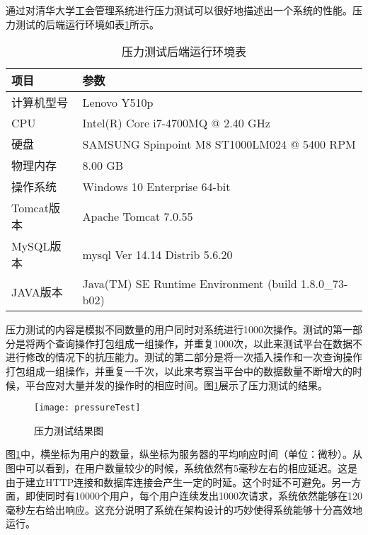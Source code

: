 通过对清华大学工会管理系统进行压力测试可以很好地描述出一个系统的性能。压力测试的后端运行环境如表\ref{table:hardware}所示。

\begin{table}
  \centering
  \caption{压力测试后端运行环境表}
  \label{table:hardware}
    \begin{tabular}{ll}
      \toprule
      项目 & 参数 \\
      \midrule %
      计算机型号 & Lenovo Y510p \\
      CPU & Intel(R) Core i7-4700MQ @ 2.40 GHz \\
      硬盘 & SAMSUNG Spinpoint M8 ST1000LM024 @ 5400 RPM \\
      物理内存 & 8.00 GB \\
      操作系统 & Windows 10 Enterprise 64-bit \\
      Tomcat版本 & Apache Tomcat 7.0.55 \\
      MySQL版本 & mysql Ver 14.14 Distrib 5.6.20\\
      JAVA版本 & Java(TM) SE Runtime Environment (build 1.8.0\_73-b02)\\
      \bottomrule
    \end{tabular}
\end{table}


压力测试的内容是模拟不同数量的用户同时对系统进行1000次操作。测试的第一部分是将两个查询操作打包组成一组操作，并重复1000次，以此来测试平台在数据不进行修改的情况下的抗压能力。测试的第二部分是将一次插入操作和一次查询操作打包组成一组操作，并重复一千次，以此来考察当平台中的数据数量不断增大的时候，平台应对大量并发的操作时的相应时间。图\ref{fig:pressure}展示了压力测试的结果。

\begin{figure}[H]
  \centering
  \texttt{[image: pressureTest]}
  \caption{压力测试结果图}
  \label{fig:pressure}
\end{figure}

图\ref{fig:pressure}中，横坐标为用户的数量，纵坐标为服务器的平均响应时间（单位：微秒）。从图中可以看到，在用户数量较少的时候，系统依然有5毫秒左右的相应延迟。这是由于建立HTTP连接和数据库连接会产生一定的时延。这个时延不可避免。另一方面，即使同时有10000个用户，每个用户连续发出1000次请求，系统依然能够在120毫秒左右给出响应。这充分说明了系统在架构设计的巧妙使得系统能够十分高效地运行。
